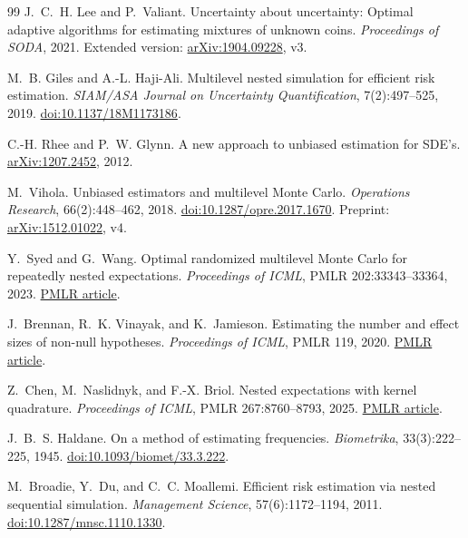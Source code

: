 \begin{thebibliography}{99}
J.~C.~H. Lee and P.~Valiant.
\newblock Uncertainty about uncertainty: Optimal adaptive algorithms for
estimating mixtures of unknown coins.
\newblock \emph{Proceedings of SODA}, 2021.
\newblock Extended version: \href{https://arxiv.org/abs/1904.09228}{arXiv:1904.09228}, v3.

M.~B. Giles and A.-L. Haji-Ali.
\newblock Multilevel nested simulation for efficient risk estimation.
\newblock \emph{SIAM/ASA Journal on Uncertainty Quantification}, 7(2):497--525, 2019.
\newblock \href{https://doi.org/10.1137/18M1173186}{doi:10.1137/18M1173186}.

C.-H. Rhee and P.~W. Glynn.
\newblock A new approach to unbiased estimation for SDE's.
\newblock \href{https://arxiv.org/abs/1207.2452}{arXiv:1207.2452}, 2012.

M.~Vihola.
\newblock Unbiased estimators and multilevel Monte Carlo.
\newblock \emph{Operations Research}, 66(2):448--462, 2018.
\newblock \href{https://doi.org/10.1287/opre.2017.1670}{doi:10.1287/opre.2017.1670}.
\newblock Preprint: \href{https://arxiv.org/abs/1512.01022}{arXiv:1512.01022}, v4.

Y.~Syed and G.~Wang.
\newblock Optimal randomized multilevel Monte Carlo for repeatedly nested expectations.
\newblock \emph{Proceedings of ICML}, PMLR 202:33343--33364, 2023.
\newblock \href{https://proceedings.mlr.press/v202/syed23a.html}{PMLR article}.

J.~Brennan, R.~K. Vinayak, and K.~Jamieson.
\newblock Estimating the number and effect sizes of non-null hypotheses.
\newblock \emph{Proceedings of ICML}, PMLR 119, 2020.
\newblock \href{https://proceedings.mlr.press/v119/brennan20a.html}{PMLR article}.

Z.~Chen, M.~Naslidnyk, and F.-X. Briol.
\newblock Nested expectations with kernel quadrature.
\newblock \emph{Proceedings of ICML}, PMLR 267:8760--8793, 2025.
\newblock \href{https://proceedings.mlr.press/v267/chen25av.html}{PMLR article}.

J.~B.~S. Haldane.
\newblock On a method of estimating frequencies.
\newblock \emph{Biometrika}, 33(3):222--225, 1945.
\newblock \href{https://doi.org/10.1093/biomet/33.3.222}{doi:10.1093/biomet/33.3.222}.

M.~Broadie, Y.~Du, and C.~C. Moallemi.
\newblock Efficient risk estimation via nested sequential simulation.
\newblock \emph{Management Science}, 57(6):1172--1194, 2011.
\newblock \href{https://doi.org/10.1287/mnsc.1110.1330}{doi:10.1287/mnsc.1110.1330}.


\end{thebibliography}
